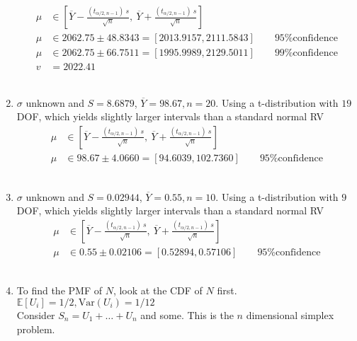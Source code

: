 \begin{enumerate}
		\begin{align}
			\mu &\in \left[ \overline{Y} - \frac{(t_{\alpha/2, n-1})\ s}{\sqrt{n}}, \ \overline{Y} + \frac{(t_{\alpha/2, n-1})\ s}{\sqrt{n}} \right] \nonumber \\
			\mu &\in 2062.75 \pm 48.8343 = [2013.9157, 2111.5843] \qquad \text{95\% confidence} \nonumber \\
			\mu &\in 2062.75 \pm 66.7511 = [1995.9989, 2129.5011] \qquad \text{99\% confidence} \nonumber \\
			v &= 2022.41
		\end{align}\\
	
	
	\item $ \sigma $ unknown and $ S = 8.6879 $, $ \overline{Y} = 98.67, n = 20$. Using a t-distribution with $ 19 $ DOF, which yields slightly larger intervals than a standard normal RV\\
	
		\begin{align}
			\mu &\in \left[ \overline{Y} - \frac{(t_{\alpha/2, n-1})\ s}{\sqrt{n}}, \ \overline{Y} + \frac{(t_{\alpha/2, n-1})\ s}{\sqrt{n}} \right] \nonumber \\
			\mu &\in 98.67 \pm 4.0660 = [94.6039, 102.7360] \qquad \text{95\% confidence} 
		\end{align}\\
	
	
	\item $ \sigma $ unknown and $ S = 0.02944 $, $ \overline{Y} = 0.55, n = 10$. Using a t-distribution with $ 9 $ DOF, which yields slightly larger intervals than a standard normal RV\\
	
		\begin{align}
			\mu &\in \left[ \overline{Y} - \frac{(t_{\alpha/2, n-1})\ s}{\sqrt{n}}, \ \overline{Y} + \frac{(t_{\alpha/2, n-1})\ s}{\sqrt{n}} \right] \nonumber \\
			\mu &\in 0.55 \pm 0.02106 = [0.52894, 0.57106] \qquad \text{95\% confidence} 
		\end{align}\\
	
	
	\item 
		To find the PMF of $ N $, look at the CDF of $ N $ first. $ \mathbb{E}[U_i] = 1/2, \mathrm{Var}(U_i) = 1/12 $\\
		Consider $ S_n = U_1 + \dots + U_n $ and some. This is the $ n $ dimensional simplex problem.\\
		

\end{enumerate}
